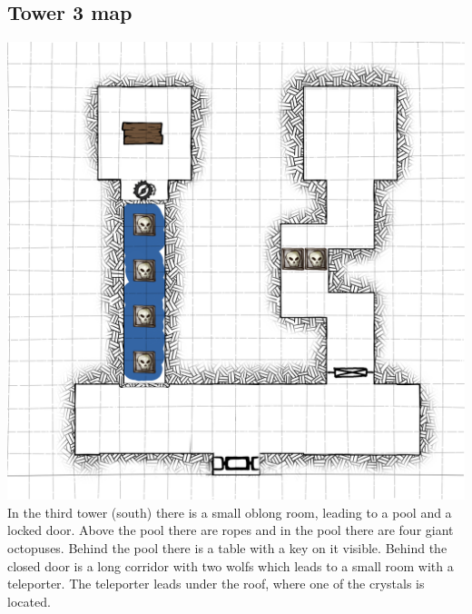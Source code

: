 \documentclass[a4paper,10pt,twoside,twocolumn,bg=print]{dndbook} %
\begin{document}
		\subsection{Tower 3 map}
		\includegraphics[width=\linewidth]{Tower3.png}
		\vspace*{4cm}\linebreak
		In the third tower (south) there is a small oblong room, leading to a pool and a locked door. Above the pool there are ropes and in the pool there are four giant octopuses. Behind the pool there is a table  with a key on it visible. Behind the closed door is a long corridor with two wolfs which leads to a small room with a teleporter. The teleporter leads under the roof, where one of the crystals is located.
		\vfill
		\pagebreak
\end{document}

